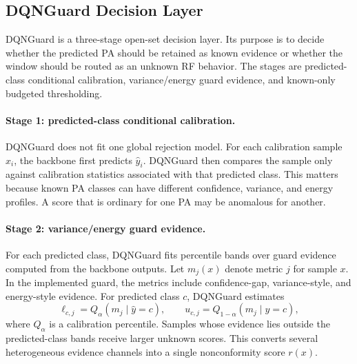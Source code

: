 \subsection{DQNGuard Decision Layer}
\label{subsec:dqnguard}

DQNGuard is a three-stage open-set decision layer. Its purpose is to decide whether the predicted PA should be retained as known evidence or whether the window should be routed as an unknown RF behavior. The stages are predicted-class conditional calibration, variance/energy guard evidence, and known-only budgeted thresholding.

\paragraph{Stage 1: predicted-class conditional calibration.}
DQNGuard does not fit one global rejection model. For each calibration sample $x_i$, the backbone first predicts $\hat{y}_i$. DQNGuard then compares the sample only against calibration statistics associated with that predicted class. This matters because known PA classes can have different confidence, variance, and energy profiles. A score that is ordinary for one PA may be anomalous for another.

\paragraph{Stage 2: variance/energy guard evidence.}
For each predicted class, DQNGuard fits percentile bands over guard evidence computed from the backbone outputs. Let $m_j(x)$ denote metric $j$ for sample $x$. In the implemented guard, the metrics include confidence-gap, variance-style, and energy-style evidence. For predicted class $c$, DQNGuard estimates
\begin{equation}
    \ell_{c,j} = Q_{\alpha}(m_j \mid \hat{y}=c),
    \qquad
    u_{c,j} = Q_{1-\alpha}(m_j \mid \hat{y}=c),
\end{equation}
where $Q_{\alpha}$ is a calibration percentile. Samples whose evidence lies outside the predicted-class bands receive larger unknown scores. This converts several heterogeneous evidence channels into a single nonconformity score $r(x)$.

